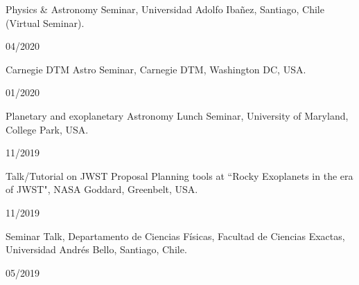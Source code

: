 \documentclass[12pt, a4paper]{article} %
\begin{document}
\begin{minipage}[t]{0.7\textwidth}
\begin{flushleft}%
  \setlength{\leftskip}{0.2cm}%
Physics \& Astronomy Seminar, Universidad Adolfo Iba\~nez, Santiago, Chile (Virtual Seminar).
\end{flushleft}
\end{minipage}
\begin{minipage}[t]{0.3\textwidth}
\hfill 04/2020
\end{minipage}
\vspace{0.2cm}

\begin{minipage}[t]{0.7\textwidth}
\begin{flushleft}%
  \setlength{\leftskip}{0.2cm}%
Carnegie DTM Astro Seminar, Carnegie DTM, Washington DC, USA.
\end{flushleft}
\end{minipage}
\begin{minipage}[t]{0.3\textwidth}
\hfill 01/2020
\end{minipage}
\vspace{0.2cm}

\begin{minipage}[t]{0.7\textwidth}
\begin{flushleft}%
  \setlength{\leftskip}{0.2cm}%
Planetary and exoplanetary Astronomy Lunch Seminar, University of Maryland, College Park, USA.
\end{flushleft}
\end{minipage}
\begin{minipage}[t]{0.3\textwidth}
\hfill 11/2019
\end{minipage}
\vspace{0.2cm}

\begin{minipage}[t]{0.7\textwidth}
\begin{flushleft}%
  \setlength{\leftskip}{0.2cm}%
Talk/Tutorial on JWST Proposal Planning tools at ``Rocky Exoplanets in the era of JWST", NASA Goddard, Greenbelt, USA.
\end{flushleft}
\end{minipage}
\begin{minipage}[t]{0.3\textwidth}
\hfill 11/2019
\end{minipage}
\vspace{0.2cm}

\begin{minipage}[t]{0.7\textwidth}
\begin{flushleft}%
  \setlength{\leftskip}{0.2cm}%
Seminar Talk, Departamento de Ciencias F\'isicas, Facultad de Ciencias
Exactas, Universidad Andr\'es Bello, Santiago, Chile.
\end{flushleft}
\end{minipage}
\begin{minipage}[t]{0.3\textwidth}
\hfill 05/2019
\end{minipage}
\vspace{0.2cm}
\end{document}
